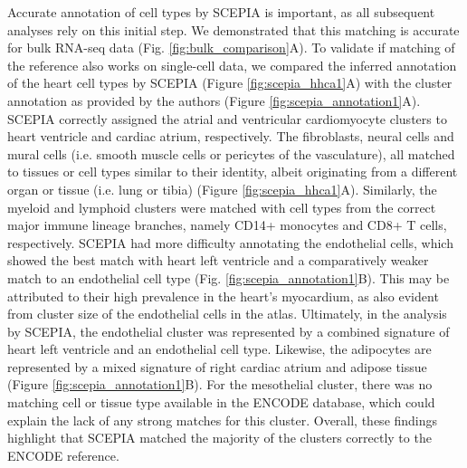 Accurate annotation of cell types by SCEPIA is important, as all subsequent analyses rely on this initial step. We demonstrated that this matching is accurate for bulk RNA-seq data (Fig. \ref{fig:bulk_comparison}A). To validate if matching of the reference also works on single-cell data, we compared the inferred annotation of the heart cell types by SCEPIA (Figure \ref{fig:scepia_hhca1}A) with the cluster annotation as provided by the authors (Figure \ref{fig:scepia_annotation1}A). SCEPIA correctly assigned the atrial and ventricular cardiomyocyte clusters to heart ventricle and cardiac atrium, respectively. The fibroblasts, neural cells and mural cells (i.e. smooth muscle cells or pericytes of the vasculature), all matched to tissues or cell types similar to their identity, albeit originating from a different organ or tissue (i.e. lung or tibia) (Figure \ref{fig:scepia_hhca1}A). Similarly, the myeloid and lymphoid clusters were matched with cell types from the correct major immune lineage branches, namely CD14+ monocytes and CD8+ T cells, respectively. SCEPIA had more difficulty annotating the endothelial cells, which showed the best match with heart left ventricle and a comparatively weaker match to an endothelial cell type (Fig. \ref{fig:scepia_annotation1}B). This may be attributed to their high prevalence in the heart's myocardium, as also evident from cluster size of the endothelial cells in the atlas. Ultimately, in the analysis by SCEPIA, the endothelial cluster was represented by a combined signature of heart left ventricle and an endothelial cell type. Likewise, the adipocytes are represented by a mixed signature of right cardiac atrium and adipose tissue (Figure \ref{fig:scepia_annotation1}B). For the mesothelial cluster, there was no matching cell or tissue type available in the ENCODE database, which could explain the lack of any strong matches for this cluster. Overall, these findings highlight that SCEPIA matched the majority of the clusters correctly to the ENCODE reference. 

